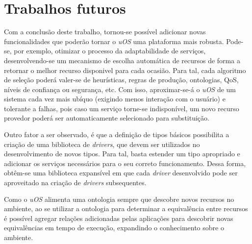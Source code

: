 \section{Trabalhos futuros}
\label{sec:trabalhosFuturos}

Com a conclusão deste trabalho, tornou-se possível adicionar novas funcionalidades que poderão tornar o \emph{uOS} uma plataforma mais robusta. Pode-se, por exemplo, otimizar o processo da adaptabilidade de serviços, desenvolvendo-se um mecanismo de escolha automática de recursos de forma a retornar o melhor recurso disponivel para cada ocasião. Para tal, cada algoritmo de seleção poderá valer-se de heurísticas, regras de produção, ontologias, QoS, níveis de confiança ou segurança, etc. Com isso, aproximar-se-á o \emph{uOS} de um sistema cada vez mais ubíquo (exigindo menos interação com o usuário) e tolerante a falhas, pois caso um serviço torne-se indisponível, um novo recurso provedor poderá ser automaticamente selecionado para substituição.

Outro fator a ser observado, é que a definição de tipos básicos possibilita a criação de uma biblioteca de \emph{drivers}, que devem ser utilizados no desenvolvimento de novos tipos. Para tal, basta estender um tipo apropriado e adicionar os serviços necessários para o seu correto funcionamento. Dessa forma, obtêm-se uma biblioteca expansível em que cada \emph{driver} desenvolvido pode ser aproveitado na criação de \emph{drivers} subsequentes.


Como o \emph{uOS} alimenta uma ontologia sempre que descobre novos recursos no ambiente, ao se utilizar a ontologia para determinar a equivalência entre recursos é possível agregar relações adicionadas pelas aplicações para descobrir novas equivalências em tempo de execução, expandindo o conhecimento sobre o ambiente.